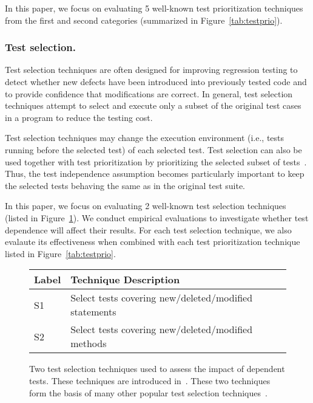 In this paper, we focus on evaluating 5 well-known test prioritization
techniques from the first and second categories (summarized
in Figure~\ref{tab:testprio}).



\subsubsection{Test selection.}

Test selection techniques are often designed for improving
regression testing to detect whether new defects
have been introduced into previously tested code and
to provide confidence that modifications
are correct. 
In general, test selection techniques attempt to select and execute
only a subset of the original test cases in a program to
reduce the testing cost.


Test selection techniques may change the execution
environment (i.e., tests running before the
selected test) of each selected test. 
Test selection can also be used together with
test prioritization by prioritizing the selected
subset of tests~\cite{}. Thus, the test independence
assumption becomes particularly important to keep the
selected tests behaving the same as in the original test suite.

In this paper, we focus on evaluating 2 well-known test
selection techniques (listed
in Figure~\ref{tab:testsel}). We conduct empirical evaluations
to investigate whether test dependence will affect their results.
For each test selection technique,
we also evalaute its effectiveness when combined with each test
prioritization technique listed in Figure~\ref{tab:testprio}.

\begin{figure}
\centering
\setlength{\tabcolsep}{0.25\tabcolsep}
\begin{tabular}{|l|l|}
\hline
\textbf{Label} & \textbf{Technique Description} \\
\hline
S1 & Select tests covering new/deleted/modified statements\\
S2 & Select tests covering new/deleted/modified methods\\
\hline
\end{tabular}
\caption{Two test selection techniques used
to assess the impact of dependent tests. These
techniques are introduced in~\cite{}. These
two techniques form the basis of many other
popular test selection techniques~\cite{}.
}
\label{tab:testsel}
\end{figure}

